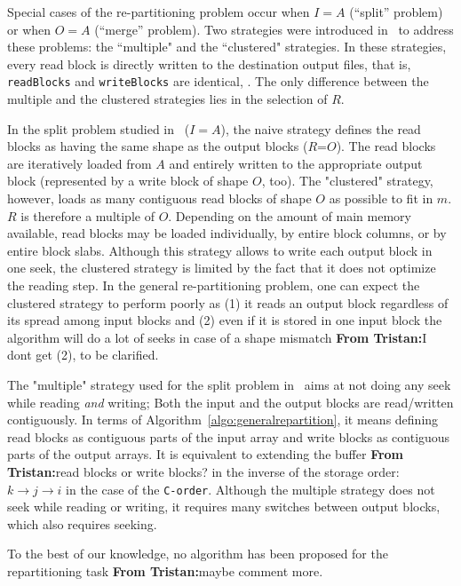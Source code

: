 \documentclass[sigconf, nonacm]{acmart}
\newcommand{\tristan}[1]{\color{orange}\textbf{From Tristan:}#1\color{black}}
\begin{document}
Special cases of the re-partitioning problem occur when $I=A$ (``split'' problem)
or when $O=A$ (``merge'' problem). Two strategies were introduced
in~\cite{seqalgorithms} to address these problems: the ``multiple" and the
``clustered" strategies. In these strategies, every read block is directly written to the
destination output files, that is, \texttt{readBlocks} and \texttt{writeBlocks} are identical, .
The only difference between the multiple and the clustered strategies lies in
the selection of $R$.

In the split problem studied in~\cite{seqalgorithms} ($I=A$), the naive
strategy defines the read blocks as having the same shape as the output blocks
($R$=$O$). The read blocks are iteratively loaded from $A$ and entirely written
to the appropriate output block (represented by a write block of shape $O$, too).
The "clustered" strategy, however, loads as
many contiguous read blocks of shape $O$ as possible to fit in $m$.
$R$ is therefore a multiple of $O$.
Depending on the amount of main memory available, read blocks may be loaded
individually, by entire block columns, or by entire block slabs.
Although this strategy allows to write each output block in one seek, the clustered strategy is limited by the fact
that it does not optimize the reading step.
In the general re-partitioning problem, one can expect the clustered strategy to
perform poorly as
(1) it reads an output block regardless of its spread among input blocks
and (2) even if it is stored in one input block the algorithm will do a lot of seeks in
case of a shape mismatch \tristan{I dont get (2), to be clarified}.

The "multiple" strategy used for the split problem in~\cite{seqalgorithms}
aims at not doing any seek while reading \textit{and} writing;
Both the input and the output blocks are read/written contiguously. In
terms of Algorithm~\ref{algo:generalrepartition}, it means defining read blocks as
contiguous parts of the input array and write blocks as contiguous parts of
the output arrays. It is equivalent to extending the buffer \tristan{read blocks or write blocks?} in the inverse of
the storage order: $k \rightarrow j \rightarrow i$ in the case
of the \texttt{C-order}. Although the multiple strategy does not seek while reading or writing, it 
requires many switches between output blocks, which also requires seeking. 

To the best of our knowledge, no algorithm has been proposed for the
repartitioning task \tristan{maybe comment more}.
\end{document}
